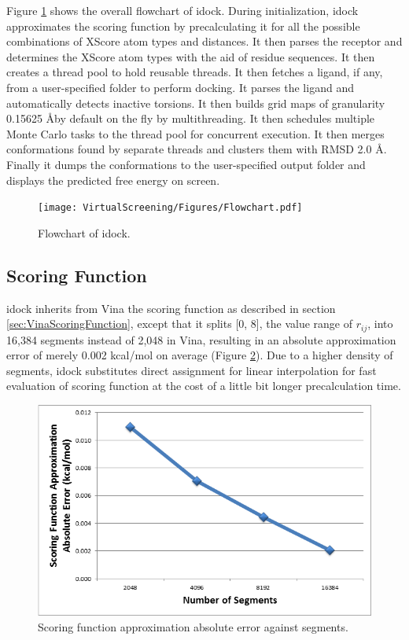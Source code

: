Figure \ref{fig:idockFlowchart} shows the overall flowchart of idock. During initialization, idock approximates the scoring function by precalculating it for all the possible combinations of XScore atom types and distances. It then parses the receptor and determines the XScore atom types with the aid of residue sequences. It then creates a thread pool to hold reusable threads. It then fetches a ligand, if any, from a user-specified folder to perform docking. It parses the ligand and automatically detects inactive torsions. It then builds grid maps of granularity 0.15625 \AA by default on the fly by multithreading. It then schedules multiple Monte Carlo tasks to the thread pool for concurrent execution. It then merges conformations found by separate threads and clusters them with RMSD 2.0 \AA. Finally it dumps the conformations to the user-specified output folder and displays the predicted free energy on screen.

\begin{figure}
\centering
\texttt{[image: VirtualScreening/Figures/Flowchart.pdf]}
\caption{Flowchart of idock.}
\label{fig:idockFlowchart}
\end{figure}

\subsection{Scoring Function}

idock inherits from Vina the scoring function as described in section \ref{sec:VinaScoringFunction}, except that it splits [0, 8], the value range of $r_{ij}$, into 16,384 segments instead of 2,048 in Vina, resulting in an absolute approximation error of merely 0.002 kcal/mol on average (Figure \ref{fig:ScoringFunctionApproximationAbsoluteError}). Due to a higher density of segments, idock substitutes direct assignment for linear interpolation for fast evaluation of scoring function at the cost of a little bit longer precalculation time.

\begin{figure}
\centering
\includegraphics[width=\textwidth]{VirtualScreening/Figures/ScoringFunctionApproximationAbsoluteError.png}
\caption{Scoring function approximation absolute error against segments.}
\label{fig:ScoringFunctionApproximationAbsoluteError}
\end{figure}

